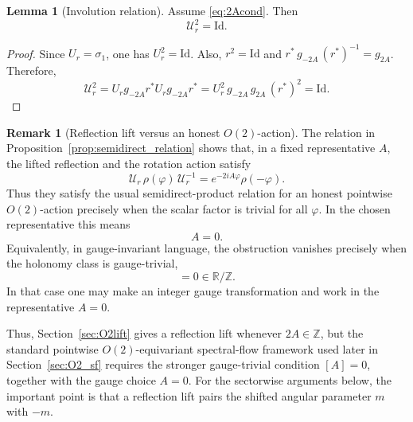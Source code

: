 \documentclass[11pt]{article}
\theoremstyle{definition}
\newtheorem{lemma}[theorem]{Lemma}
\newtheorem{remark}[remark]{Remark}
\numberwithin{equation}{section}
\newcommand{\Id}{\text{Id}}
\begin{document}
\begin{lemma}[Involution relation]
\label{lem:Ur_involution}
Assume \eqref{eq:2Acond}. Then
\begin{equation}\label{eq:Ur_squared}
\mathcal U_r^2=\Id.
\end{equation}
\end{lemma}

\begin{proof}
Since \(U_r=\sigma_1\), one has \(U_r^2=\Id\).
Also, \(r^2=\Id\) and \(r^*\,g_{-2A}\,(r^*)^{-1}=g_{2A}\).
Therefore,
\begin{equation}\label{eq:Ur_square_calc}
\mathcal U_r^2
=
U_r g_{-2A} r^* U_r g_{-2A} r^*
=
U_r^2\, g_{-2A}\, g_{2A}\, (r^*)^2
=
\Id.
\end{equation}
\end{proof}

\begin{remark}[Reflection lift versus an honest \texorpdfstring{$O(2)$}{O(2)}-action]
\label{rem:central_character}
The relation in Proposition~\ref{prop:semidirect_relation} shows that, in a fixed
representative \(A\), the lifted reflection and the rotation action satisfy
\begin{equation}
\mathcal U_r\,\rho(\varphi)\,\mathcal U_r^{-1}
=
e^{-2iA\varphi}\rho(-\varphi).
\end{equation}
Thus they satisfy the usual semidirect-product relation for an honest pointwise
\(O(2)\)-action precisely when the scalar factor is trivial for all \(\varphi\). In the
chosen representative this means
\begin{equation}
A=0.
\end{equation}
Equivalently, in gauge-invariant language, the obstruction vanishes precisely when the
holonomy class is gauge-trivial,
\begin{equation}
[A]=0\in \mathbb R/\mathbb Z.
\end{equation}
In that case one may make an integer gauge transformation and work in the representative
\(A=0\).

Thus, Section~\ref{sec:O2lift} gives a reflection lift whenever \(2A\in\mathbb Z\), but the
standard pointwise \(O(2)\)-equivariant spectral-flow framework used later in
Section~\ref{sec:O2_sf} requires the stronger gauge-trivial condition \([A]=0\), together
with the gauge choice \(A=0\). For the sectorwise arguments below, the important point is
that a reflection lift pairs the shifted angular parameter \(m\) with \(-m\).
\end{remark}
\end{document}
